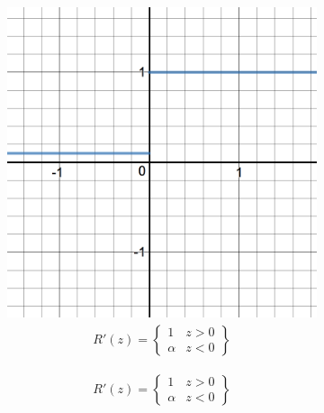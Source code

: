 \begin{itemize}
\begin{figure}[H]
\begin{subfigure}{0.5\textwidth}
            \includegraphics[width=0.9\linewidth]{fig/actfunc_leakyrelu_der.png}
            \caption{%
                \begin{equation}
                    \begin{split}R'(z) = \begin{Bmatrix} 1 & z>0 \\
                        \alpha & z<0 \end{Bmatrix}\end{split}
                \end{equation}
            }
            \label{fig:actfunc_leakyrelu_der}
        \end{subfigure}
    \end{figure}


\end{itemize}
